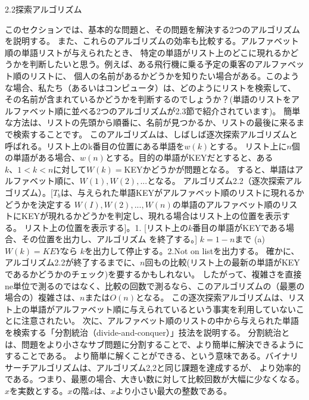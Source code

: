 
2.2探索アルゴリズム

このセクションでは、基本的な問題と、その問題を解決する2つのアルゴリズムを説明する。
また、これらのアルゴリズムの効率も比較する。アルファベット順の単語リストが与えられたとき、
特定の単語がリスト上のどこに現れるかどうかを判断したいと思う。例えば、ある飛行機に乗る予定の乗客のアルファベット順のリストに、
個人の名前があるかどうかを知りたい場合がある。このような場合、私たち（あるいはコンピュータ）は、どのようにリストを検索して、
その名前が含まれているかどうかを判断するのでしょうか？(単語のリストをアルファベット順に並べる2つのアルゴリズムが2.3節で紹介されています)。
簡単な方法は、リストの先頭から順番に、名前が見つかるか、リストの最後に来るまで検索することです。
このアルゴリズムは、しばしば逐次探索アルゴリズムと呼ばれる。リスト上のk番目の位置にある単語を$w(k)$とする。
リスト上に$n$個の単語がある場合、$w(n)$とする。目的の単語がKEYだとすると、ある$k、1< k < n$に対して$W(k)=$KEYかどうかが問題となる。
すると、単語はアルファベット順に、$W(1), W(2), ...$となる。
アルゴリズム2.2（逐次探索アルゴリズム）。[$T_b$は、与えられた単語KEYがアルファベット順のリストに現れるかどうかを決定する
$W(I), W(2),...,W(n)$の単語のアルファベット順のリストにKEYが現れるかどうかを判定し、現れる場合はリスト上の位置を表示する。
リスト上の位置を表示する]。1. [リスト上の$k$番目の単語がKEYである場合、その位置を出力し、アルゴリズム
を終了する。]
$k = 1-n$まで (a) $W(k) = KEY$なら
$k$を出力して停止する。2.Not on listを出力する。
確かに、アルゴリズム2.2が終了するまでに、$n$回もの比較(リスト上の最新の単語がKEYであるかどうかのチェック)を要するかもしれない。
したがって、複雑さを直接ne単位で測るのではなく、比較の回数で測るなら、このアルゴリズムの（最悪の場合の）複雑さは、$n$または$O(n)$となる。
この逐次探索アルゴリズムは、リスト上の単語がアルファベット順に与えられているという事実を利用していないことに注意されたい。
次に、アルファベット順のリストの中から与えられた単語を検索する「分割統治（divide-and-conquer）」技法を説明する。
分割統治とは、問題をより小さなサブ問題に分割することで、より簡単に解決できるようにすることである。
より簡単に解くことができる、という意味である。バイナリサーチアルゴリズムは、アルゴリズム2,2と同じ課題を達成するが、
より効率的である。つまり、最悪の場合、大きい数に対して比較回数が大幅に少なくなる。$x$を実数とする。$x$の階$x$は、$x$より小さい最大の整数である。